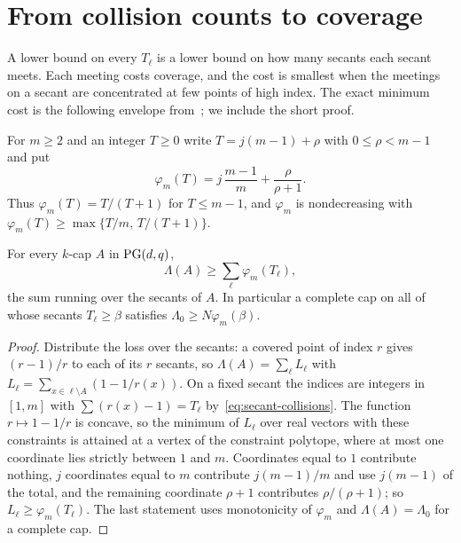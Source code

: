 \section{From collision counts to coverage}
\label{sec:coverage}

A lower bound on every \(T_\ell\) is a lower bound on how many secants
each secant meets.  Each meeting costs coverage, and the cost is smallest
when the meetings on a secant are concentrated at few points of high
index.  The exact minimum cost is the following envelope
from~\cite[Section~5]{RuddSecantDefects}; we include the short proof.

For \(m\ge2\) and an integer \(T\ge0\) write \(T=j(m-1)+\rho\) with
\(0\le\rho<m-1\) and put
\begin{equation}
 \varphi_m(T)=j\,\frac{m-1}{m}+\frac{\rho}{\rho+1}.
\label{eq:phi}
\end{equation}
Thus \(\varphi_m(T)=T/(T+1)\) for \(T\le m-1\), and
\(\varphi_m\) is nondecreasing with
\(\varphi_m(T)\ge\max\{T/m,\,T/(T+1)\}\).

\begin{theorem}
\label{thm:secant-local}
For every \(k\)-cap \(A\) in \(\mathrm{PG}(d,q)\),
\[
 \Lambda(A)\ge\sum_{\ell}\varphi_m(T_\ell),
\]
the sum running over the secants of \(A\).  In particular a complete cap
on all of whose secants \(T_\ell\ge\beta\) satisfies
\(\Lambda_0\ge N\varphi_m(\beta)\).
\end{theorem}

\begin{proof}
Distribute the loss over the secants: a covered point of index \(r\)
gives \((r-1)/r\) to each of its \(r\) secants, so
\(\Lambda(A)=\sum_\ell L_\ell\) with
\(L_\ell=\sum_{x\in\ell\setminus A}(1-1/r(x))\).  On a fixed secant the
indices are integers in \([1,m]\) with \(\sum(r(x)-1)=T_\ell\)
by~\eqref{eq:secant-collisions}.  The function \(r\mapsto1-1/r\) is
concave, so the minimum of \(L_\ell\) over real vectors with these
constraints is attained at a vertex of the constraint polytope, where at
most one coordinate lies strictly between \(1\) and \(m\).  Coordinates
equal to \(1\) contribute nothing, \(j\) coordinates equal to \(m\)
contribute \(j(m-1)/m\) and use \(j(m-1)\) of the total, and the remaining
coordinate \(\rho+1\) contributes \(\rho/(\rho+1)\); so
\(L_\ell\ge\varphi_m(T_\ell)\).  The last statement uses monotonicity of
\(\varphi_m\) and \(\Lambda(A)=\Lambda_0\) for a complete cap.
\end{proof}

